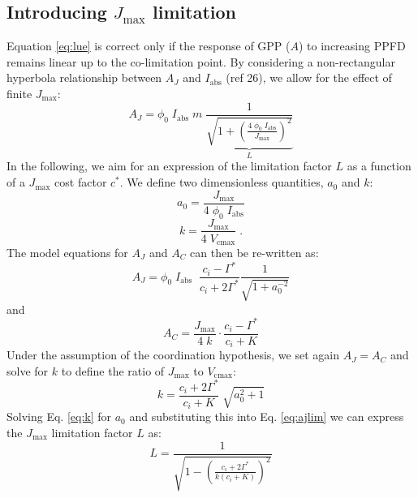 \documentclass{myreport}
\begin{document}
\subsection{Introducing $J_{\mathrm{max}}$ limitation}
Equation \ref{eq:lue} is correct only if the response of GPP ($A$) to increasing PPFD remains linear up to the co-limitation point. 
By considering a non-rectangular hyperbola relationship between $A_J$ and $I_{\mathrm{abs}}$ (ref 26), we allow for the effect of finite $J_{\mathrm{max}}$:
\begin{equation}
\label{eq:ajlim}
    A_J = \phi_0 \; I_{\mathrm{abs}} \; m \; \underbrace{ \frac{1}{\sqrt{1+ \left( \frac{4\;\phi_0\;I_{\mathrm{abs}}}{J_{\mathrm{max}}} \right)^{2}}} }_{L}
\end{equation}
In the following, we aim for an expression of the limitation factor $L$ as a function of a $J_{\mathrm{max}}$ cost factor $c^{\ast}$. 
We define two dimensionless quantities, $a_0$ and $k$:
\begin{equation}
\label{eq:a0}
    a_0 = \frac{J_{\mathrm{max}}}{4\;\phi_0\;I_{\mathrm{abs}}}
\end{equation}
\begin{equation}
    k = \frac{J_{\mathrm{max}}}{4\;V_{\mathrm{cmax}}}\;.
\end{equation}
The model equations for $A_J$ and $A_C$ can then be re-written as:
\begin{equation}
\label{eq:ajlim2}
    A_J = \phi_0 \; I_{\mathrm{abs}} \; \; \frac{c_i - \Gamma^{\ast}}{c_i + 2\Gamma^{\ast}} \frac{1}{\sqrt{1+a_0^{-2}}}
\end{equation}
and
\begin{equation}
    A_C = \frac{J_{\mathrm{max}}}{4\;k} \cdot \frac{c_i - \Gamma^{\ast}}{c_i + K}
\end{equation}
Under the assumption of the coordination hypothesis, we set again $A_J = A_C$ and solve for $k$ to define the ratio of $J_{\mathrm{max}}$ to $V_{\mathrm{cmax}}$:
\begin{equation}
\label{eq:k}
    k = \frac{c_i + 2\Gamma^{\ast}}{c_i + K} \; \sqrt{a_0^2 + 1}
\end{equation}
Solving Eq. \ref{eq:k} for $a_0$ and substituting this into Eq. \ref{eq:ajlim} we can express the $J_{\mathrm{max}}$ limitation factor $L$ as:
\begin{equation}
\label{eq:ajlim3}
    L = \frac{1}{\sqrt{1 - \left( \frac{c_i+2\Gamma^{\ast}}{k(c_i+K)} \right)^{2}}}
\end{equation}
\end{document}
